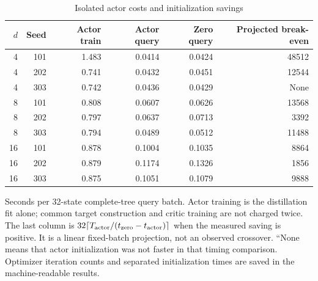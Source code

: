 \begin{table}[t]
\centering
\caption{Isolated actor costs and initialization savings}
\label{tab:r5_actor_timing}
\small
\begin{tabular}{rrrrrr}
\toprule
$d$ & Seed & Actor train & Actor query & Zero query & Projected break-even \\
\midrule
4 & 101 & 1.483 & 0.0414 & 0.0424 & 48512 \\
4 & 202 & 0.741 & 0.0432 & 0.0451 & 12544 \\
4 & 303 & 0.742 & 0.0436 & 0.0429 & None \\
8 & 101 & 0.808 & 0.0607 & 0.0626 & 13568 \\
8 & 202 & 0.797 & 0.0637 & 0.0713 & 3392 \\
8 & 303 & 0.794 & 0.0489 & 0.0512 & 11488 \\
16 & 101 & 0.878 & 0.1004 & 0.1035 & 8864 \\
16 & 202 & 0.879 & 0.1174 & 0.1326 & 1856 \\
16 & 303 & 0.875 & 0.1051 & 0.1079 & 9888 \\
\bottomrule
\end{tabular}
\par\medskip
\begin{minipage}{.97\linewidth}
\footnotesize Seconds per 32-state complete-tree query batch. Actor training is the distillation fit alone; common target construction and critic training are not charged twice. The last column is $32\lceil T_{\rm actor}/(t_{\rm zero}-t_{\rm actor})\rceil$ when the measured saving is positive. It is a linear fixed-batch projection, not an observed crossover. ``None means that actor initialization was not faster in that timing comparison. Optimizer iteration counts and separated initialization times are saved in the machine-readable results.
\end{minipage}
\end{table}
